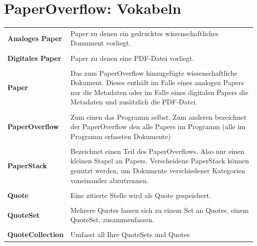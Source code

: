 \documentclass[a4paper,12pt]{article}
\begin{document}
\section{PaperOverflow: Vokabeln}
\begin{tabular}{ p{5cm} p{8.5cm} }
  \textbf{Analoges Paper} & Paper zu denen ein gedrucktes wissenschaftliches Domument vorliegt. \\ \\
  \textbf{Digitales Paper} & Paper zu denen eine PDF-Datei vorliegt. \\ \\
  \textbf{Paper} & Das zum PaperOverflow hinzugefügte wissenschaftliche Dokument. Dieses enthält im Falle eines analogen Papers nur die Metadaten oder im Falle eines digitalen Papers die Metadaten und zusätzlich die PDF-Datei. \\ \\
  \textbf{PaperOverflow} & Zum einen das Programm selbst. Zum anderen bezeichnet der PaperOverflow den alle Papers im Programm (alle im Programm erfassten Dokumente) \\ \\
  \textbf{PaperStack} & Bezeichnet einen Teil des PaperOverflows. Also nur einen kleinen Stapel an Papers. Verscheidene PaperStack können genutzt werden, um Dokumente verschiedener Kategorien voneinander abzutrennen.\\ \\
  \textbf{Quote} & Eine zitierte Stelle wird als Quote gespeichert.\\ \\
  \textbf{QuoteSet} & Mehrere Quotes lassen sich zu einem Set an Quotes, einem QuoteSet, zusammenfassen.\\ \\
  \textbf{QuoteCollection} & Umfasst all Ihre QuoteSets und Quotes
\end{tabular}
\end{document}
